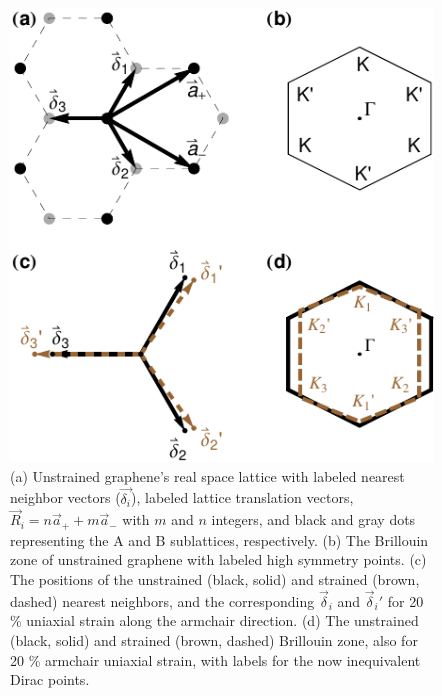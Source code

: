 \begin{figure}
\includegraphics{Figs_PVP/figure_1.pdf}
\caption{\label{lattice} (a) Unstrained graphene's real space lattice with labeled nearest neighbor vectors ($\vec{\delta_i}$), labeled lattice translation vectors, $\vec{R}_i=n\vec{a}_+ + m \vec{a}_-$ with $m$ and $n$ integers, and black and gray dots representing the A and B sublattices, respectively. (b) The Brillouin zone of unstrained graphene with labeled high symmetry points. (c) The positions of the unstrained (black, solid) and strained (brown, dashed) nearest neighbors, and the corresponding $\vec{\delta}_i$ and $\vec{\delta}_i'$ for 20 \% uniaxial strain along the armchair direction.  (d) The unstrained (black, solid) and strained (brown, dashed) Brillouin zone, also for 20 \% armchair uniaxial strain, with labels for the now inequivalent Dirac points. }
\end{figure}


